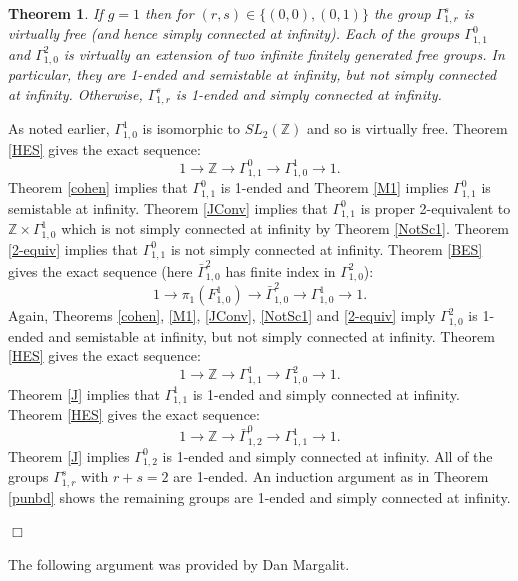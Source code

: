 \documentclass[12pt]{article}
\newtheorem{theorem}{Theorem}[subsection]
\newenvironment{proof}{\addvspace{12pt}\noindent{\bf Proof:}}{
$\Box$\par\addvspace{12pt}}
\begin{document}
\begin{theorem} \label{punbd2} 
If $g=1$ then for $(r,s)\in \{(0,0), (0,1)\}$ the group $\Gamma_{1,r}^s$ is virtually free (and hence simply connected at infinity). Each of the groups $\Gamma_{1,1}^0$ and $\Gamma_{1,0}^2$ is virtually an extension of two infinite finitely generated free groups. In particular, they are 1-ended and semistable at infinity, but not simply connected at infinity. Otherwise, $\Gamma_{1,r}^s$ is 1-ended and simply connected at infinity. 
\end{theorem} 
\begin{proof}
As noted earlier, $\Gamma_{1,0}^1$ is isomorphic to $SL_2(\mathbb Z)$ and so is virtually free. Theorem \ref{HES} gives the exact sequence:
$$1\to \mathbb Z \to \Gamma_{1,1}^0\to \Gamma_{1,0}^1\to 1.$$ 
Theorem \ref{cohen} implies that $\Gamma_{1,1}^0$ is 1-ended and Theorem \ref{M1} implies $\Gamma_{1,1}^0$ is semistable at infinity. Theorem \ref{JConv} implies that $\Gamma_{1,1}^0$ is proper 2-equivalent to $\mathbb Z \times \Gamma_{1,0}^1$ which is not simply connected at infinity by Theorem \ref{NotSc1}. Theorem \ref{2-equiv} implies that $ \Gamma_{1,1}^0$ is not simply connected at infinity. Theorem \ref {BES} gives the exact sequence (here $\bar \Gamma_{1,0}^2$ has finite index in $\Gamma_{1,0}^2$): 
$$1\to \pi_1(F_{1,0}^1) \to \bar \Gamma_{1,0}^2\to \Gamma_{1,0}^1\to 1.$$
Again, Theorems \ref{cohen}, \ref{M1}, \ref{JConv}, \ref{NotSc1} and \ref{2-equiv} imply $\Gamma _{1,0}^2$ is 1-ended and semistable at infinity, but not simply connected at infinity. Theorem \ref{HES} gives the exact sequence:
$$1\to \mathbb Z\to \Gamma_{1,1}^1\to \Gamma_{1,0}^2\to 1.$$
Theorem \ref{J} implies that $\Gamma_{1,1}^1$ is 1-ended and simply connected at infinity. Theorem \ref{HES} gives the exact sequence:
$$1\to \mathbb Z\to \bar \Gamma_{1,2}^0\to \Gamma_{1,1}^1\to 1.$$
Theorem \ref{J} implies $\Gamma_{1,2}^0$ is 1-ended and simply connected at infinity. All of the groups $\Gamma_{1,r}^s$ with $r+s=2$ are 1-ended. An induction argument as in Theorem \ref{punbd} shows the remaining groups are 1-ended and simply connected at infinity. 
\end{proof}


The following argument was provided by Dan Margalit. 
 
\end{document}
